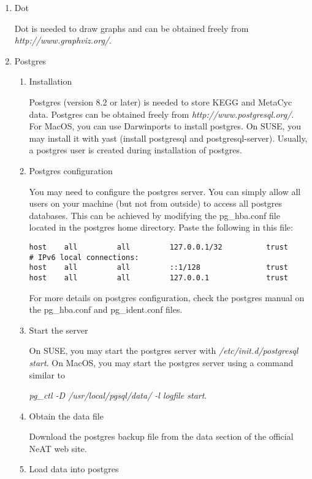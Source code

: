 \documentclass{book}
\begin{document}
\begin{enumerate}

\item Dot

Dot is needed to draw graphs and can be obtained freely from \textit{http://www.graphviz.org/}.

\item Postgres
\begin{enumerate}
\item Installation

Postgres (version 8.2 or later) is needed to store KEGG and MetaCyc data.
Postgres can be obtained freely from
\textit{http://www.postgresql.org/}.
For MacOS, you can use Darwinports to install postgres. On SUSE, you may
install it with yast (install postgresql and postgresql-server).
Usually, a postgres user is created during installation of postgres.

\item Postgres configuration

You may need to configure the postgres server. You can simply
allow all users on your machine (but not from outside) to access
all postgres databases.
This can be achieved by modifying the pg\_hba.conf file
located in the postgres home directory. Paste the following in this file:
\begin{lstlisting}
host    all         all         127.0.0.1/32          trust
# IPv6 local connections:
host    all         all         ::1/128               trust
host    all         all         127.0.0.1             trust
\end{lstlisting}
For more details on postgres configuration, check the postgres manual
on the pg\_hba.conf and pg\_ident.conf files.

\item Start the server

On SUSE, you may start the postgres server with
\textit{/etc/init.d/postgresql start}. On MacOS, you may start the postgres server
using a command similar to

\textit{pg\_ctl -D /usr/local/pgsql/data/ -l logfile start}.


\item Obtain the data file

Download the postgres backup file 
from the data section of the official NeAT web site.

\item Load data into postgres


\end{enumerate}
\end{enumerate}
\end{document}
